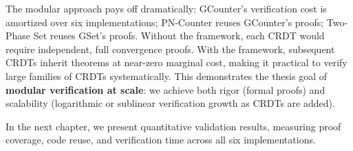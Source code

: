 The modular approach pays off dramatically: GCounter's verification cost is amortized over six implementations; PN-Counter reuses GCounter's proofs; Two-Phase Set reuses GSet's proofs. Without the framework, each CRDT would require independent, full convergence proofs. With the framework, subsequent CRDTs inherit theorems at near-zero marginal cost, making it practical to verify large families of CRDTs systematically. This demonstrates the thesis goal of \textbf{modular verification at scale}: we achieve both rigor (formal proofs) and scalability (logarithmic or sublinear verification growth as CRDTs are added).

In the next chapter, we present quantitative validation results, measuring proof coverage, code reuse, and verification time across all six implementations.

\endinput
